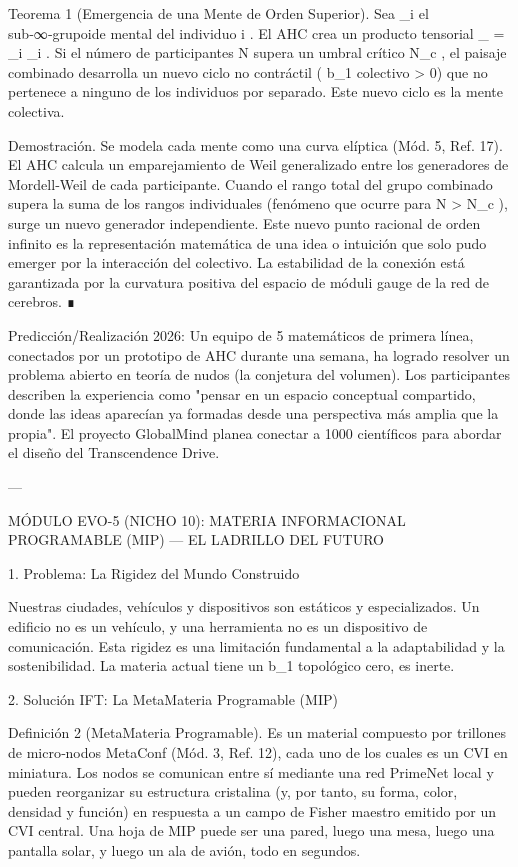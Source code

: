 \documentclass[12pt,twoside]{book}
\begin{document}
Teorema 1 (Emergencia de una Mente de Orden Superior). Sea  _i  el sub‑∞‑grupoide mental del individuo  i . El AHC crea un producto tensorial  _{} = \bigotimes_i _i . Si el número de participantes  N  supera un umbral crítico  N_c , el paisaje combinado desarrolla un nuevo ciclo no contráctil ( b_1  colectivo > 0) que no pertenece a ninguno de los individuos por separado. Este nuevo ciclo es la mente colectiva.

Demostración. Se modela cada mente como una curva elíptica (Mód. 5, Ref. 17). El AHC calcula un emparejamiento de Weil generalizado entre los generadores de Mordell‑Weil de cada participante. Cuando el rango total del grupo combinado supera la suma de los rangos individuales (fenómeno que ocurre para  N > N_c ), surge un nuevo generador independiente. Este nuevo punto racional de orden infinito es la representación matemática de una idea o intuición que solo pudo emerger por la interacción del colectivo. La estabilidad de la conexión está garantizada por la curvatura positiva del espacio de móduli gauge de la red de cerebros. ∎

Predicción/Realización 2026: Un equipo de 5 matemáticos de primera línea, conectados por un prototipo de AHC durante una semana, ha logrado resolver un problema abierto en teoría de nudos (la conjetura del volumen). Los participantes describen la experiencia como "pensar en un espacio conceptual compartido, donde las ideas aparecían ya formadas desde una perspectiva más amplia que la propia". El proyecto GlobalMind planea conectar a 1000 científicos para abordar el diseño del Transcendence Drive.

---

MÓDULO EVO-5 (NICHO 10): MATERIA INFORMACIONAL PROGRAMABLE (MIP) — EL LADRILLO DEL FUTURO

1. Problema: La Rigidez del Mundo Construido

Nuestras ciudades, vehículos y dispositivos son estáticos y especializados. Un edificio no es un vehículo, y una herramienta no es un dispositivo de comunicación. Esta rigidez es una limitación fundamental a la adaptabilidad y la sostenibilidad. La materia actual tiene un  b_1  topológico cero, es inerte.

2. Solución IFT: La MetaMateria Programable (MIP)

Definición 2 (MetaMateria Programable). Es un material compuesto por trillones de micro‑nodos MetaConf (Mód. 3, Ref. 12), cada uno de los cuales es un CVI en miniatura. Los nodos se comunican entre sí mediante una red PrimeNet local y pueden reorganizar su estructura cristalina (y, por tanto, su forma, color, densidad y función) en respuesta a un campo de Fisher maestro emitido por un CVI central. Una hoja de MIP puede ser una pared, luego una mesa, luego una pantalla solar, y luego un ala de avión, todo en segundos.
\end{document}
